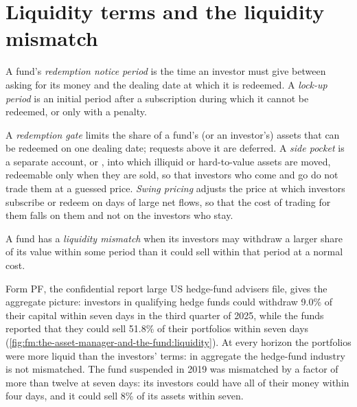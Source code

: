 \section{Liquidity terms and the liquidity mismatch}

\begin{definition}\label{def:fm:the-asset-manager-and-the-fund:notice}
A fund's \emph{redemption notice period} is the time an investor must give between asking for its money and
the dealing date at which it is redeemed. A \emph{lock-up period} is an initial period after a subscription during which
it cannot be redeemed, or only with a penalty.
\end{definition}

\begin{definition}\label{def:fm:the-asset-manager-and-the-fund:gate}
A \emph{redemption gate} limits the share of a fund's (or an investor's) assets that can be redeemed on one dealing date;
requests above it are deferred. A \emph{side pocket} is a separate account, or , into which illiquid or
hard-to-value assets are moved, redeemable only when they are sold, so that investors who come and go do not trade them at a guessed price.
\emph{Swing pricing} adjusts the price at which investors subscribe or redeem on days of large net flows, so that the
cost of trading for them falls on them and not on the investors who stay.
\end{definition}

\begin{definition}\label{def:fm:the-asset-manager-and-the-fund:mismatch}
A fund has a \emph{liquidity mismatch} when its investors may withdraw a larger share of its value within some period
than it could sell within that period at a normal cost.
\end{definition}

Form PF, the confidential report large US hedge-fund advisers file, gives the aggregate picture: investors in qualifying hedge funds could
withdraw 9.0\% of their capital within seven days in the third quarter of 2025, while the funds reported that they could sell 51.8\% of their
portfolios within seven days (\cref{fig:fm:the-asset-manager-and-the-fund:liquidity}). At every horizon the portfolios were more liquid than the
investors' terms: in aggregate the hedge-fund industry is not mismatched. The fund suspended in 2019 was mismatched by a factor of more than twelve
at seven days: its investors could have all of their money within four days, and it could sell 8\% of its assets within seven.

